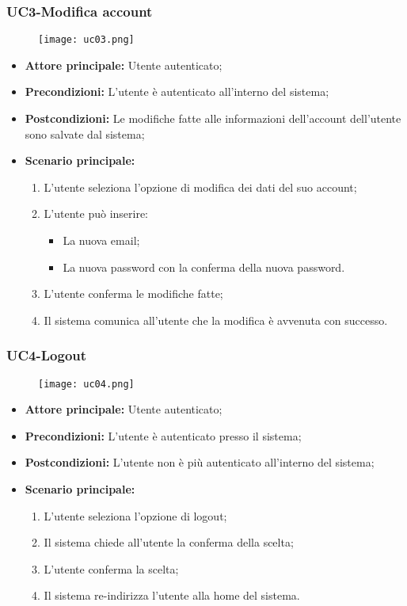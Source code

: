 \nonstopmode
\pagebreak
\subsubsection{UC3-Modifica account}
\begin{figure}[h] \texttt{[image: uc03.png]} \end{figure}
\begin{itemize}
    \item \textbf{Attore principale:} Utente autenticato;
    \item \textbf{Precondizioni:} L'utente è autenticato all'interno del sistema;
    \item \textbf{Postcondizioni:} Le modifiche fatte alle informazioni dell'account dell'utente sono salvate dal sistema;
    \item \textbf{Scenario principale:}
        \begin{enumerate}
            \item L'utente seleziona l'opzione di modifica dei dati del suo account;
            \item L'utente può inserire:
              \begin{itemize}
                \item La nuova email;
                \item La nuova password con la conferma della nuova password.
              \end{itemize}
            \item L'utente conferma le modifiche fatte;
            \item Il sistema comunica all'utente che la modifica è avvenuta con successo.
        \end{enumerate}
\end{itemize}

\subsubsection{UC4-Logout}
\begin{figure}[h] \texttt{[image: uc04.png]} \end{figure}
\begin{itemize}
    \item \textbf{Attore principale:} Utente autenticato;
    \item \textbf{Precondizioni:} L'utente è autenticato presso il sistema;
    \item \textbf{Postcondizioni:} L'utente non è più autenticato all'interno del sistema;
    \item \textbf{Scenario principale:}
    \begin{enumerate}
        \item L'utente seleziona l'opzione di logout;
        \item Il sistema chiede all'utente la conferma della scelta;
        \item L'utente conferma la scelta;
        \item Il sistema re-indirizza l'utente alla home del sistema.
    \end{enumerate}
\end{itemize}


